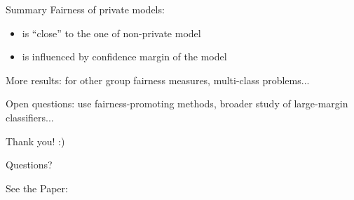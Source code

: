 \documentclass[aspectratio=169,14pt]{beamer}
\begin{document}
\begin{frame}{Summary}
Fairness of private models:
\begin{itemize}
\item is “close” to the one of non-private model
\item is influenced by confidence margin of the model
\end{itemize}

More results: for other group fairness measures, multi-class problems...

Open questions: use fairness-promoting methods, broader
study of large-margin classifiers...

\end{frame}

\begin{frame}
  \begin{center}
    \vspace{3em}

    \Huge
    Thank you! :)
    
    Questions?

  \end{center}
    \small
    See the Paper:\\[0.5em]

    ~~~~
\end{frame}
\end{document}
